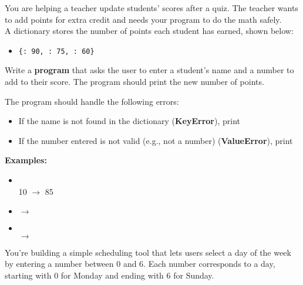 




	\item 
		You are helping a teacher update students' scores after a quiz.  
		The teacher wants to add points for extra credit and needs your program to 
		do the math safely.\\

		A dictionary stores the number of points each student has earned, shown below: 
		\begin{itemize}
			\item \texttt{\{: 90, : 75, : 60\}}
		\end{itemize}
		Write a \textbf{program} that asks the user to enter a student's name and a number 
		to add to their score. The program should print the new number of points.

		The program should handle the following errors:
		\begin{itemize}
			\item If the name is not found in the dictionary (\textbf{KeyError}), 
				print 
			\item If the number entered is not valid (e.g., not a number) (\textbf{ValueError}), 
				print 
		\end{itemize}

		\textbf{Examples:}
		\begin{itemize}
			\item {}  \\
			       10 $\rightarrow$ 85
			\item {}  $\rightarrow$ 
			\item {}  \\
			        $\rightarrow$ 
		\end{itemize}





	\item 
		You're building a simple scheduling tool that lets users select a day of the week by 
		entering a number between 0 and 6.  
		Each number corresponds to a day, starting with 0 for Monday and ending with 6 for Sunday.\\

